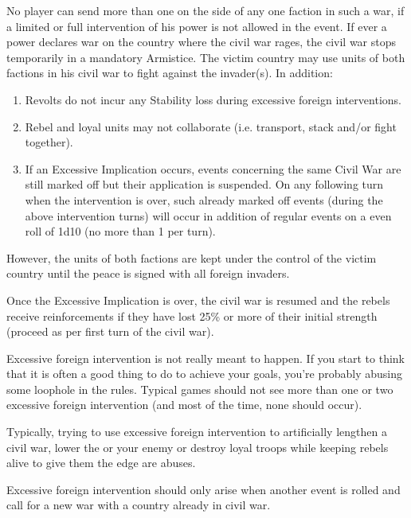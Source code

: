 No player can send more than one \ARMY\faceplus on the side of any one faction
in such a war, if a limited or full intervention of his power is not allowed
in the event.
\bparag If ever a power declares war on the country where the civil war rages,
the civil war stops temporarily in a mandatory Armistice. The victim country
may use units of both factions in his civil war to fight against the
invader(s). In addition:
\begin{enumerate}
\item Revolts do not incur any Stability loss during excessive foreign
  interventions.
\item Rebel and loyal units may not collaborate (i.e. transport, stack and/or
  fight together).
\item If an Excessive Implication occurs, events concerning the same Civil War
  are still marked off but their application is suspended. On any following
  turn when the intervention is over, such already marked off events (during
  the above intervention turns) will occur in addition of regular events on a
  even roll of 1d10 (no more than 1 per turn).
\end{enumerate}
\bparag However, the units of both factions are kept under the control of the
victim country until the peace is signed with all foreign invaders.

\bparag Once the Excessive Implication is over, the civil war is resumed and
the rebels receive reinforcements if they have lost 25\% or more of their
initial strength (proceed as per first turn of the civil war).

\begin{designnote}
  Excessive foreign intervention is not really meant to happen. If you start
  to think that it is often a good thing to do to achieve your goals, you're
  probably abusing some loophole in the rules. Typical games should not see
  more than one or two excessive foreign intervention (and most of the time,
  none should occur).

  Typically, trying to use excessive foreign intervention to artificially
  lengthen a civil war, lower the \STAB or your enemy or destroy loyal troops
  while keeping rebels alive to give them the edge are abuses.

  Excessive foreign intervention should only arise when another event is
  rolled and call for a new war with a country already in civil war.
\end{designnote}

